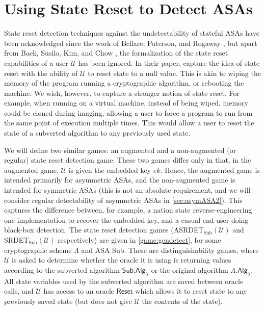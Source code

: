 \chapter{Using State Reset to Detect ASAs} \label{sec:statereset}

State reset detection techniques against the undetectability of stateful ASAs have been acknowledged since the work of Bellare, Paterson, and Rogaway \cite{C:BelPatRog14}, but apart from Baek, Susilo, Kim, and Chow \cite{BSKC2019}, the formalization of the state reset capabilities of a user $\mathcal{U}$ has been ignored. In their paper, \cite{BSKC2019} capture the idea of state reset with the ability of $\mathcal{U}$ to reset state to a null value. This is akin to wiping the memory of the program running a cryptographic algorithm, or rebooting the machine. We wish, however, to capture a stronger notion of state reset. For example, when running on a virtual machine, instead of being wiped, memory could be cloned during imaging, allowing a user to force a program to run from the same point of execution multiple times. This would allow a user to reset the state of a subverted algorithm to any previously used state.

We will define two similar games: an augmented and a non-augmented (or regular) state reset detection game. These two games differ only in that, in the augmented game, $\mathcal{U}$ is given the embedded key $ek$. Hence, the augmented game is intended primarily for asymmetric ASAs, and the non-augmented game is intended for symmetric ASAs (this is not an absolute requirement, and we will consider regular detectability of asymmetric ASAs in \autoref{sec:asymASA2}). This captures the difference between, for example, a nation state reverse-engineering one implementation to recover the embedded key, and a casual end-user doing black-box detection. The state reset detection games (ASRDET$_{\mathrm{Sub}}(\mathcal{U})$ and SRDET$_{\mathrm{Sub}}(\mathcal{U})$ respectively) are given in \autoref{game:gendetect}, for some cryptographic scheme $\mathsf{\Lambda}$ and ASA \textsf{Sub}. These are distinguishability games, where $\mathcal{U}$ is asked to determine whether the oracle it is using is returning values according to the subverted algorithm $\mathsf{Sub.Alg}_\lambda$ or the original algorithm $\mathsf{\Lambda.Alg}_\lambda$. All state variables used by the subverted algorithm are saved between oracle calls, and $\mathcal{U}$ has access to an oracle $\mathsf{Reset}$ which allows it to reset state to any previously saved state (but does not give $\mathcal{U}$ the contents of the state).

